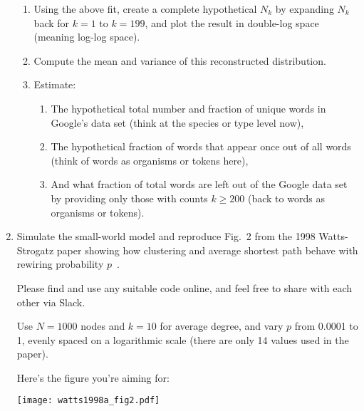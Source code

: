 \begin{enumerate}
  \begin{enumerate}
  \item 
    Using the above fit, create a complete hypothetical $N_{k}$ 
    by expanding $N_{k}$ back for $k=1$ to $k=199$, and plot
    the result in double-log space (meaning log-log space).
  \item 
    Compute the mean and variance of this reconstructed distribution.
  \item 
    Estimate:
    \begin{enumerate}
    \item 
      The hypothetical total number and fraction of unique words in
      Google's data set (think at the species or type level now),
    \item 
      The hypothetical fraction of words that appear once
      out of all words
      (think of words as organisms or tokens here),
    \item 
      And what fraction of total words are left out of the Google data set
      by providing only those with counts $k \ge 200$ (back to words as organisms or tokens).
    \end{enumerate}
  \end{enumerate}

  
   \solutionstart


   \solutionend




  

\item
  Simulate the small-world model and reproduce
  Fig.~2 from the 1998 Watts-Strogatz
  paper showing how clustering and average shortest
  path behave with rewiring probability $p$~\cite{watts1998a}.

  Please find and use any suitable code online,
  and feel free to share with each other via Slack.

  Use $N=1000$ nodes and $k=10$ for average degree,
  and vary $p$ from 0.0001 to 1, evenly spaced on a logarithmic
  scale (there are only 14 values used in the paper).

  Here's the figure you're aiming for:

  \texttt{[image: watts1998a\_fig2.pdf]}
  
  
   \solutionstart


   \solutionend

  


\end{enumerate}
